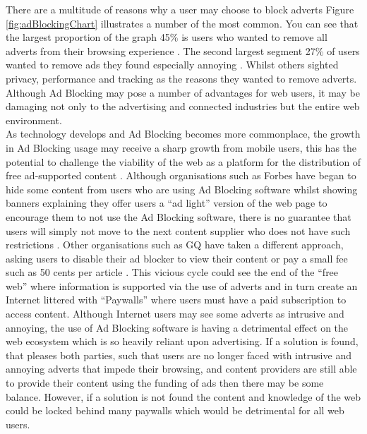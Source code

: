 \documentclass[12pt]{article}
\begin{document}
There are a multitude of reasons why a user may choose to block adverts Figure \ref{fig:adBlockingChart} illustrates a number of the most common. You can see that the largest proportion of the graph 45\% is users who wanted to remove all adverts from their browsing experience \parencite{publishersWeb}. The second largest segment 27\% of users wanted to remove ads they found especially annoying \parencite{publishersWeb}. Whilst others sighted privacy, performance and tracking as the reasons they wanted to remove adverts. Although Ad Blocking may pose a number of advantages for web users, it may be damaging not only to the advertising and connected industries but the entire web environment. \\

As technology develops and Ad Blocking becomes more commonplace, the growth in Ad Blocking usage may receive a sharp growth from mobile users,  this has the potential to challenge the viability of the web as a platform for the distribution of free ad-supported content \parencite{adobeAdBlock}. Although organisations such as Forbes have began to hide some content from users who are using Ad Blocking software whilst showing banners explaining they offer users a ``ad light'' version of the web page to encourage them to not use the Ad Blocking software, there is no guarantee that users will simply not move to the next content supplier who does not have such restrictions \parencite{publishersWeb}. Other organisations such as GQ have taken a different approach, asking users to disable their ad blocker to view their content or pay a small fee such as 50 cents per article \parencite{gq}.  This vicious cycle could see the end of the ``free web'' where information is supported via the use of adverts and in turn create an Internet littered with ``Paywalls'' where users must have a paid subscription to access content. Although Internet users may see some adverts as intrusive and annoying, the use of Ad Blocking software is having a detrimental effect on the web ecosystem which is so heavily reliant upon advertising. If a solution is found, that pleases both parties, such that users are no longer faced with intrusive and annoying adverts that impede their browsing, and content providers are still able to provide their content using the funding of ads then there may be some balance. However, if a solution is not found the content and knowledge of the web could be locked behind many paywalls which would be detrimental for all web users.
\end{document}
